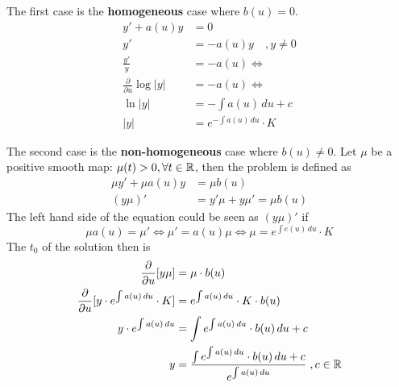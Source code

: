 The first case is the \textbf{homogeneous} case where $b(u) = 0$.
\begin{align*}
    y'+a(u)y & = 0\\
    y' & = -a(u)y \quad ,y\neq 0\\
    \frac{y'}{y} & = -a(u) \Leftrightarrow\\
    \frac{\partial}{\partial u} \log|y| & = -a(u) \Leftrightarrow\\
    \ln|y| & = -\int a(u)\, du + c\\
    |y| & = e^{-\int a(u)\, du}\cdot K
\end{align*}

The second case is the \textbf{non-homogeneous} case where $b(u)\neq0$.
Let $\mu$ be a positive smooth map: $\mu(t)>0, \forall t\in\mathbb{R}$, then the problem is defined as
\begin{align*}
    \mu y' + \mu a(u) y & = \mu b(u)\\
    (y\mu)' & = y'\mu + y\mu' = \mu b(u)
\end{align*}
The left hand side of the equation could be seen as $(y\mu)'$ if
\begin{equation*}
    \mu a(u) = \mu' \Leftrightarrow \mu' = a(u)\mu \Leftrightarrow \mu = e^{\int e(u)\, du}\cdot K
\end{equation*}
The $t_0$ of the solution then is
\begin{align*}
    \frac{\partial}{\partial u}[y\mu] & = \mu\cdot b(u)\\
    \frac{\partial}{\partial u}[y\cdot e^{\int a(u)\, du}\cdot K] & = e^{\int a(u)\,du}\cdot K \cdot b(u)\\
    y\cdot e^{\int a(u)\, du} & = \int e^{\int a(u)\, du}\cdot b(u)\, du + c\\
    y & = \frac{\int e^{\int a(u)\, du}\cdot b(u)\, du + c}{e^{\int a(u)\, du}}\; ,c\in\mathbb{R}
\end{align*}

